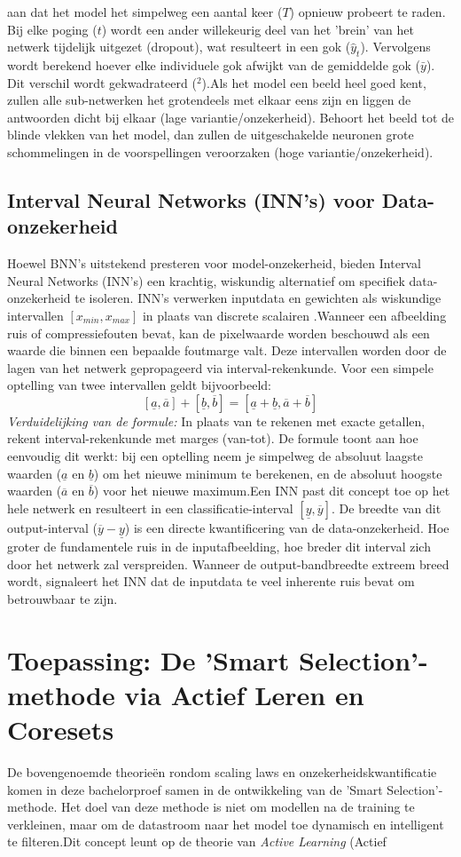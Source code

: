 aan dat het model het simpelweg een aantal keer ($T$) opnieuw probeert te raden. Bij elke poging ($t$) wordt een ander willekeurig deel van het 'brein' van het netwerk tijdelijk uitgezet (dropout), wat resulteert in een gok ($\hat{y}_t$). Vervolgens wordt berekend hoever elke individuele gok afwijkt van de gemiddelde gok ($\bar{y}$). Dit verschil wordt gekwadrateerd ($^2$).Als het model een beeld heel goed kent, zullen alle sub-netwerken het grotendeels met elkaar eens zijn en liggen de antwoorden dicht bij elkaar (lage variantie/onzekerheid). Behoort het beeld tot de blinde vlekken van het model, dan zullen de uitgeschakelde neuronen grote schommelingen in de voorspellingen veroorzaken (hoge variantie/onzekerheid).\subsection{Interval Neural Networks (INN's) voor Data-onzekerheid}Hoewel BNN's uitstekend presteren voor model-onzekerheid, bieden Interval Neural Networks (INN's) een krachtig, wiskundig alternatief om specifiek data-onzekerheid te isoleren. INN's verwerken inputdata en gewichten als wiskundige intervallen $[x_{min}, x_{max}]$ in plaats van discrete scalairen \autocite{ishibuchi1993architecture}.Wanneer een afbeelding ruis of compressiefouten bevat, kan de pixelwaarde worden beschouwd als een waarde die binnen een bepaalde foutmarge valt. Deze intervallen worden door de lagen van het netwerk gepropageerd via interval-rekenkunde. Voor een simpele optelling van twee intervallen geldt bijvoorbeeld:$$[\underline{a}, \overline{a}] + [\underline{b}, \overline{b}] = [\underline{a} + \underline{b}, \overline{a} + \overline{b}]$$\textit{Verduidelijking van de formule:} In plaats van te rekenen met exacte getallen, rekent interval-rekenkunde met marges (van-tot). De formule toont aan hoe eenvoudig dit werkt: bij een optelling neem je simpelweg de absoluut laagste waarden ($\underline{a}$ en $\underline{b}$) om het nieuwe minimum te berekenen, en de absoluut hoogste waarden ($\overline{a}$ en $\overline{b}$) voor het nieuwe maximum.Een INN past dit concept toe op het hele netwerk en resulteert in een classificatie-interval $[\underline{y}, \overline{y}]$. De breedte van dit output-interval ($\overline{y} - \underline{y}$) is een directe kwantificering van de data-onzekerheid. Hoe groter de fundamentele ruis in de inputafbeelding, hoe breder dit interval zich door het netwerk zal verspreiden. Wanneer de output-bandbreedte extreem breed wordt, signaleert het INN dat de inputdata te veel inherente ruis bevat om betrouwbaar te zijn.\section{Toepassing: De 'Smart Selection'-methode via Actief Leren en Coresets}\label{sec:smart-selection}De bovengenoemde theorieën rondom scaling laws en onzekerheidskwantificatie komen in deze bachelorproef samen in de ontwikkeling van de 'Smart Selection'-methode. Het doel van deze methode is niet om modellen na de training te verkleinen, maar om de datastroom naar het model toe dynamisch en intelligent te filteren.Dit concept leunt op de theorie van \textit{Active Learning} (Actief 